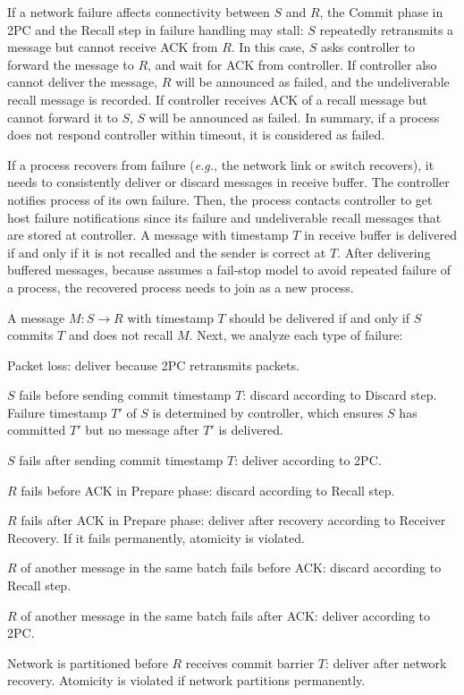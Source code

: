  If a network failure affects connectivity between $S$ and $R$, the Commit phase in 2PC and the Recall step in failure handling may stall: $S$ repeatedly retransmits a message but cannot receive ACK from $R$. In this case, $S$ asks controller to forward the message to $R$, and wait for ACK from controller. If controller also cannot deliver the message, $R$ will be announced as failed, and the undeliverable recall message is recorded. If controller receives ACK of a recall message but cannot forward it to $S$, $S$ will be announced as failed. In summary, if a process does not respond controller within timeout, it is considered as failed.

 If a process recovers from failure (\emph{e.g.}, the network link or switch recovers), it needs to consistently deliver or discard messages in receive buffer. The controller notifies process of its own failure. Then, the process contacts controller to get host failure notifications since its failure and undeliverable recall messages that are stored at controller. A message with timestamp $T$ in receive buffer is delivered if and only if it is not recalled and the sender is correct at $T$. After delivering buffered messages, because \sys{} assumes a fail-stop model to avoid repeated failure of a process, the recovered process needs to join \sys{} as a new process.

A message $M: S \rightarrow R$ with timestamp $T$ should be delivered if and only if $S$ commits $T$ and does not recall $M$. Next, we analyze each type of failure:
\begin{ecompact}
\item Packet loss: deliver because 2PC retransmits packets.
\item $S$ fails before sending commit timestamp $T$: discard according to Discard step. Failure timestamp $T'$ of $S$ is determined by controller, which ensures $S$ has committed $T'$ but no message after $T'$ is delivered.
\item $S$ fails after sending commit timestamp $T$: deliver according to 2PC.
\item $R$ fails before ACK in Prepare phase: discard according to Recall step.
\item $R$ fails after ACK in Prepare phase: deliver after recovery according to Receiver Recovery. If it fails permanently, atomicity is violated.
\item $R$ of another message in the same batch fails before ACK: discard according to Recall step.
\item $R$ of another message in the same batch fails after ACK: deliver according to 2PC.
\item Network is partitioned before $R$ receives commit barrier $T$: deliver after network recovery. Atomicity is violated if network partitions permanently.
\end{ecompact}

